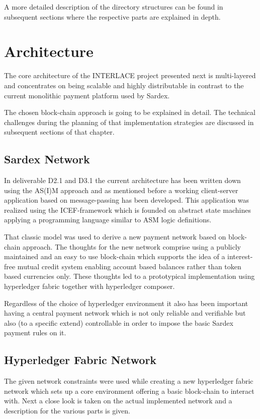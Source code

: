 A more detailed description of the directory structures can be found in subsequent sections where the respective parts are explained in depth.

\section{Architecture}

The core architecture of the INTERLACE project presented next is multi-layered and concentrates on being scalable and highly distributable in contrast to the current monolithic payment platform used by Sardex.

The chosen block-chain approach is going to be explained in detail. The technical challenges during the planning of that implementation strategies are discussed in subsequent sections of that chapter.

\subsection{Sardex Network}

In deliverable D2.1 and D3.1 the current architecture has been written down using the AS(I)M approach and as mentioned before a working client-server application based on message-passing has been developed. This application was realized using the ICEF-framework which is founded on abstract state machines applying a programming language similar to ASM logic definitions.

That classic model was used to derive a new payment network based on block-chain approach. The thoughts for the new network comprise using a publicly maintained and an easy to use block-chain which supports the idea of a interest-free mutual credit system enabling account based balances rather than token based currencies only. These thoughts led to a prototypical implementation using hyperledger fabric together with hyperledger composer.

Regardless of the choice of hyperledger environment it also has been important having a central payment network which is not only reliable and verifiable but also (to a specific extend) controllable in order to impose the basic Sardex payment rules on it.

\subsection{Hyperledger Fabric Network}

The given network constraints were used while creating a new hyperledger fabric network which sets up a core environment offering a basic block-chain to interact with. Next a close look is taken on the actual implemented network and a description for the various parts is given.

